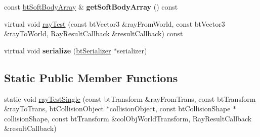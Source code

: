 \begin{DoxyCompactItemize}
\item 
\hypertarget{classbt_soft_rigid_dynamics_world_a59821d263de56fec8ee82d0d4f7294a8}{const \hyperlink{classbt_aligned_object_array}{bt\+Soft\+Body\+Array} \& {\bfseries get\+Soft\+Body\+Array} () const }\label{classbt_soft_rigid_dynamics_world_a59821d263de56fec8ee82d0d4f7294a8}

\item 
virtual void \hyperlink{classbt_soft_rigid_dynamics_world_a1d914916b59d57a72295129f2d710d4a}{ray\+Test} (const bt\+Vector3 \&ray\+From\+World, const bt\+Vector3 \&ray\+To\+World, Ray\+Result\+Callback \&result\+Callback) const 
\item 
\hypertarget{classbt_soft_rigid_dynamics_world_ac7770632b7372c54d2d85d33109bcfbf}{virtual void {\bfseries serialize} (\hyperlink{classbt_serializer}{bt\+Serializer} $\ast$serializer)}\label{classbt_soft_rigid_dynamics_world_ac7770632b7372c54d2d85d33109bcfbf}

\end{DoxyCompactItemize}
\subsection*{Static Public Member Functions}
\begin{DoxyCompactItemize}
\item 
static void \hyperlink{classbt_soft_rigid_dynamics_world_a918218d4fe565ce42fd78c9d06d22cb0}{ray\+Test\+Single} (const bt\+Transform \&ray\+From\+Trans, const bt\+Transform \&ray\+To\+Trans, bt\+Collision\+Object $\ast$collision\+Object, const bt\+Collision\+Shape $\ast$collision\+Shape, const bt\+Transform \&col\+Obj\+World\+Transform, Ray\+Result\+Callback \&result\+Callback)
\end{DoxyCompactItemize}
